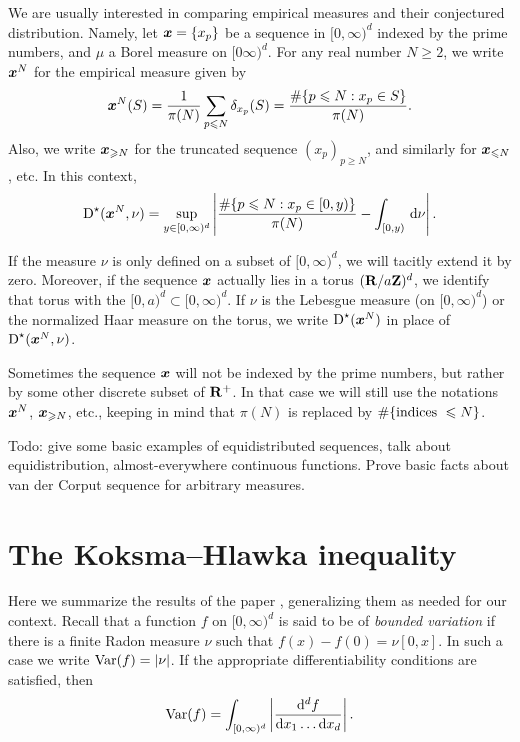 We are usually interested in comparing empirical measures and their conjectured 
distribution. Namely, let ${\boldsymbol x} = \{x_p\}$ be a sequence in $[0,\infty)^d$ 
indexed by the prime numbers, and $\mu$ a Borel measure on $[0\infty)^d$. For 
any real number $N\geqslant 2$, we write ${\boldsymbol x}^N$ for the empirical measure 
given by 
\[
	{\boldsymbol x}^N(S) = \frac{1}{\pi(N)} \sum_{p\leqslant N} \delta_{x_p}(S) = \frac{\# \{p\leqslant N : x_p\in S\}}{\pi(N)} .
\]
Also, we write ${\boldsymbol x}_{\geqslant N}$ for the truncated sequence 
$(x_p)_{p\geqslant N}$, and similarly for ${\boldsymbol x}_{\leqslant N}$, etc. In this 
context, 
\[
	\operatorname{D}^\star({\boldsymbol x}^N,\nu) = \sup_{y\in [0,\infty)^d} \left| \frac{\# \{p\leqslant N : x_p \in [0,y)\}}{\pi(N)} - \int_{[0,y)} \, \mathrm{d}\nu\right| .
\]

If the measure $\nu$ is only defined on a subset of $[0,\infty)^d$, we will 
tacitly extend it by zero. Moreover, if the sequence ${\boldsymbol x}$ actually lies in a 
torus $(\mathbf{R}/a \mathbf{Z})^d$, we identify that torus with the 
$[0,a)^d\subset [0,\infty)^d$. If $\nu$ is the Lebesgue measure (on 
$[0,\infty)^d$) or the normalized Haar measure on the torus, we write 
$\operatorname{D}^\star({\boldsymbol x}^N)$ in place of $\operatorname{D}^\star({\boldsymbol x}^N, \nu)$. 

Sometimes the sequence ${\boldsymbol x}$ will not be indexed by the prime numbers, but 
rather by some other discrete subset of $\mathbf{R}^+$. In that case we will still 
use the notations ${\boldsymbol x}^N$, ${\boldsymbol x}_{\geqslant N}$, etc., keeping in mind that 
$\pi(N)$ is replaced by $\#\{\textnormal{indices }\leqslant N\}$. 

Todo: give some basic examples of equidistributed sequences, talk about 
equidistribution, almost-everywhere continuous functions. Prove basic facts 
about van der Corput sequence for arbitrary measures. 





\section{The Koksma--Hlawka inequality}

Here we summarize the results of the paper \cite{okten-1999}, generalizing them 
as needed for our context. Recall that a function $f$ on $[0,\infty)^d$ is 
said to be of \emph{bounded variation} if there is a finite Radon measure $\nu$ 
such that $f(x) - f(0) = \nu[0,x]$. In such a case we write 
$\operatorname{Var}(f) = |\nu|$. If the appropriate differentiability conditions are 
satisfied, then 
\[
	\operatorname{Var}(f) = \int_{[0,\infty)^d} \left|\frac{\mathrm{d}^d f}{\mathrm{d} x_1 \dots \mathrm{d} x_d} \right|.
\]

